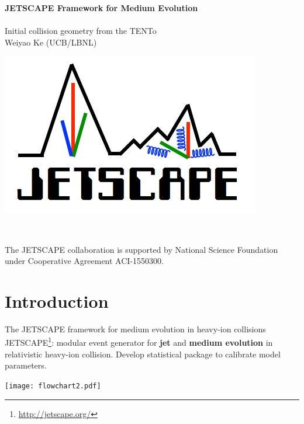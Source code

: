 \documentclass[11pt, aspectratio=169]{beamer}
\author[Weiyao Ke]{}
\title[JETSCAPE Summer School 2020]{}
\begin{document}
\date[July, 2020]{}
\begin{frame}
\vspace{2.5em}
\begin{center}
{\Large  \color{navyblue} \bf JETSCAPE Framework for Medium Evolution} \\ 
\usebox{\myrule}\\
\vspace{.5em}
{\Large \color{navyblue} Initial collision geometry from the TENTo}\\
\vspace{1em}
Weiyao Ke (UCB/LBNL)
\end{center}

\begin{center}
\begin{minipage}{.2\textwidth}
\includegraphics[width=\textwidth]{jetscape-logo.jpeg}
\end{minipage}\\
\begin{minipage}{.6\textwidth}
\begin{center}
{\color{gray} \footnotesize The JETSCAPE collaboration is supported by National Science Foundation under Cooperative Agreement ACI-1550300.}
\end{center}
\end{minipage}
\end{center}

\end{frame}

\begin{frame}
\tableofcontents
\end{frame}

\section{Introduction}
\begin{frame}{The JETSCAPE framework for medium evolution in heavy-ion collisions}
JETSCAPE\footnote{\href{http://jetscape.org/}{http://jetscape.org/}}: modular event generator for {\bf jet} and {\bf medium evolution} in relativistic heavy-ion collision. Develop statistical package to calibrate model parameters.
\begin{center}
\texttt{[image: flowchart2.pdf]}
\end{center}
\end{frame}
\end{document}

